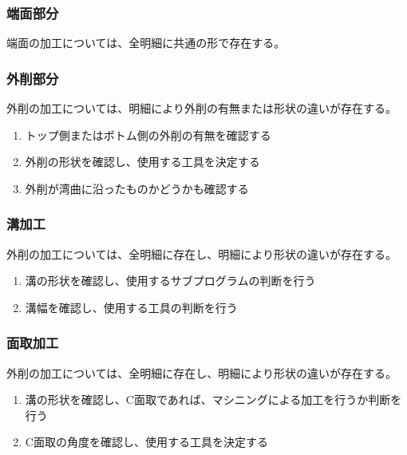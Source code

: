 \subsubsection{端面部分}
端面の加工については、全明細に共通の形で存在する。

\subsubsection{外削部分}
外削の加工については、明細により外削の有無または形状の違いが存在する。
\begin{enumerate}
\item トップ側またはボトム側の外削の有無を確認する
\item 外削の形状を確認し、使用する工具を決定する
\item {}外削が湾曲に沿ったものかどうかも確認する
\end{enumerate}

\subsubsection{溝加工}
外削の加工については、全明細に存在し、明細により形状の違いが存在する。
\begin{enumerate}
\item 溝の形状を確認し、使用するサブプログラムの判断を行う
\item {}溝幅を確認し、使用する工具の判断を行う
\end{enumerate}

\subsubsection{面取加工}
外削の加工については、全明細に存在し、明細により形状の違いが存在する。
\begin{enumerate}
\item 溝の形状を確認し、C面取であれば、マシニングによる加工を行うか判断を行う
\item {}C面取の角度を確認し、使用する工具を決定する
\end{enumerate}


